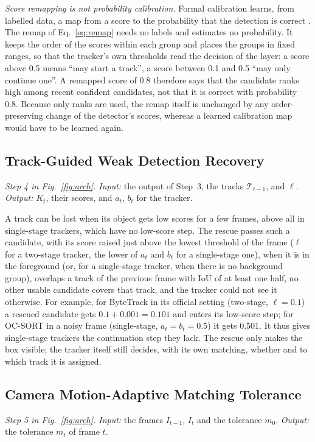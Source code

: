 \emph{Score remapping is not probability calibration.} Formal calibration learns, from labelled
data, a map from a score to the probability that the detection is correct \cite{kuppers2020detcalib}.
The remap of Eq.~\eqref{eq:remap} needs no labels and estimates no probability. It keeps the order
of the scores within each group and places the groups in fixed ranges, so that the tracker's own
thresholds read the decision of the layer: a score above 0.5 means ``may start a track'', a score
between 0.1 and 0.5 ``may only continue one''. A remapped score of 0.8 therefore says that the
candidate ranks high among recent confident candidates, not that it is correct with probability
0.8. Because only ranks are used, the remap itself is unchanged by any order-preserving change of
the detector's scores, whereas a learned calibration map would have to be learned again.

\subsection{Track-Guided Weak Detection Recovery}\label{sec:rescue}
\emph{Step 4 in Fig.~\ref{fig:arch}. Input:} the output of Step~3, the tracks $\mathcal{T}_{t-1}$, and $\ell$. \emph{Output:}
$K_t$, their scores, and $a_t$, $b_t$ for the tracker.

A track can be lost when its object gets low scores for a few frames, above all in single-stage
trackers, which have no low-score step. The rescue passes such a candidate, with its score raised
just above the lowest threshold of the frame ($\ell$ for a two-stage tracker, the lower of $a_t$
and $b_t$ for a single-stage one), when it is in the foreground (or, for a single-stage tracker,
when there is no background group), overlaps a track of the previous frame with IoU of at least
one half, no other usable candidate covers that track, and the tracker could not see it otherwise.
For example, for ByteTrack in its official setting (two-stage, $\ell=0.1$) a rescued candidate gets
$0.1+0.001=0.101$ and enters its low-score step; for OC-SORT in a noisy frame (single-stage,
$a_t=b_t=0.5$) it gets $0.501$. It thus gives single-stage trackers the continuation step they
lack. The rescue only makes the box
visible; the tracker itself still decides, with its own matching, whether and to which track it is
assigned.

\subsection{Camera Motion-Adaptive Matching Tolerance}\label{sec:motion}
\emph{Step 5 in Fig.~\ref{fig:arch}. Input:} the frames $I_{t-1}$, $I_t$ and the tolerance $m_0$. \emph{Output:} the tolerance
$m_t$ of frame $t$.

